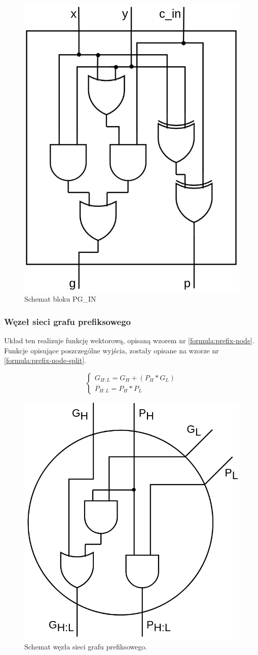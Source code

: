 \documentclass[12pt,oneside,reqno]{article}
\begin{document}
\begin{figure}[H]
\centering
\includegraphics[width=0.5\linewidth]{diagrams/pg_in_block.png}
\caption{Schemat bloku PG\_IN}\label{fig:diagram_pg_in}
\end{figure}

\subsubsection{Węzeł sieci grafu prefiksowego}
\label{section:prefix-node}
Układ ten realizuje funkcję wektorową, opisaną wzorem nr \ref{formula:prefix-node}. Funkcje opisujące poszczególne wyjścia, zostały opisane na wzorze nr \ref{formula:prefix-node-split}. 

\begin{equation}
    \begin{cases}
        G_{H:L} = G_H + (P_H * G_L) \\
        P_{H:L} = P_H * P_L
    \end{cases}       
    \label{formula:prefix-node-split}
\end{equation}


\begin{figure}[H]
\centering
\includegraphics[width=0.5\linewidth]{diagrams/prefix_node.png}
\caption{Schemat węzła sieci grafu prefiksowego.}\label{fig:diagram_prefix_node}
\end{figure}
\end{document}
